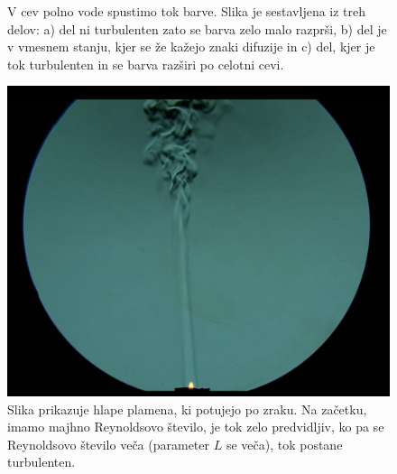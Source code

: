 \documentclass[mat2, tisk]{fmfdelo}
\begin{document}
\begin{itemize}
\begin{figure}[h!]
\caption{V cev polno vode spustimo tok barve. Slika je sestavljena iz treh delov: a) del ni turbulenten zato se barva zelo malo razprši,
b) del je v vmesnem stanju, kjer se že kažejo znaki difuzije in c) del, kjer je tok turbulenten in se barva razširi po celotni cevi.}
\label{fig:difus}
\end{figure}
\begin{figure}[h]
  \centering
\includegraphics[scale=0.19]{slike/Reynolds.jpeg}
\caption{Slika prikazuje hlape plamena, ki potujejo po zraku. Na začetku, imamo majhno Reynoldsovo število, je tok zelo predvidljiv,
ko pa se Reynoldsovo število veča (parameter $L$ se veča), tok postane turbulenten.}
\end{figure}
\end{itemize}
\end{document}
